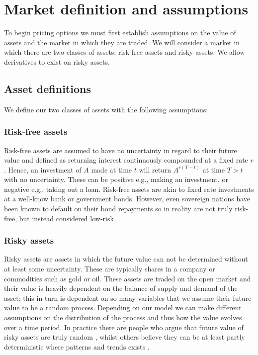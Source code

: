\section{Market definition and assumptions}

To begin pricing options we must first establish assumptions on the value of assets and the market in which they are traded. We will consider a market in which there are two classes of assets; risk-free assets and risky assets. We allow derivatives to exist on risky assets.

\subsection{Asset definitions}

We define our two classes of assets with the following assumptions:

\subsubsection{Risk-free assets}

Risk-free assets are assumed to have no uncertainty in regard to their future value and defined as returning interest continuously compounded at a fixed rate \(r\). Hence, an investment of \(A\) made at time \(t\) will return \(A^{r\left(T-t\right)}\) at time \(T>t\) with no uncertainty. These can be positive e.g., making an investment, or negative e.g., taking out a loan. Risk-free assets are akin to fixed rate investments at a well-know bank or government bonds. However, even sovereign nations have been known to default on their bond repayments so in reality are not truly risk-free, but instead considered low-risk \cite{kitanov2015risk}.

\subsubsection{Risky assets}

Risky assets are assets in which the future value can not be determined without at least some uncertainty. These are typically shares in a company or commodities such as gold or oil. These assets are traded on the open market and their value is heavily dependent on the balance of supply and demand of the asset; this in turn is dependent on so many variables that we assume their future value to be a random process. Depending on our model we can make different assumptions on the distribution of the process and thus how the value evolves over a time period. In practice there are people who argue that future value of risky assets are truly random \cite{RandomWalkFama}, whilst others believe they can be at least partly deterministic where patterns and trends exists \cite{shiller}.

